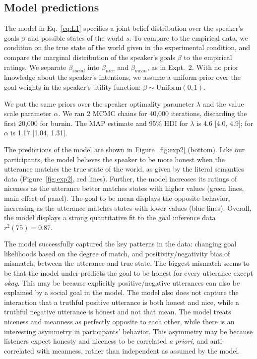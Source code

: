 \documentclass[10pt,letterpaper]{article}
\begin{document}
\subsection{Model predictions}

The model in Eq.~\ref{eq:L1} specifies a joint-belief distribution over the speaker's goals $\beta$ and possible states of the world $s$.
To compare to the empirical data, we condition on the true state of the world given in the experimental condition, and compare the marginal distribution of the speaker's goals $\beta$ to the empirical ratings.
We separate $\beta_{social}$ into  $\beta_{nice}$ and  $\beta_{mean}$, as in Expt.~2.
With no prior knowledge about the speaker's intentions, we assume a uniform prior over the goal-weights in the speaker's utility function: $\beta \sim \text{Uniform}(0,1)$.

We put the same priors over the speaker optimality parameter $\lambda$ and the value scale parameter $\alpha$.
We ran 2 MCMC chains for 40,000 iterations, discarding the first 20,000 for burnin.
The MAP estimate and 95\% HDI for $\lambda$ is 4.6 [4.0, 4.9]; for $\alpha$ is 1.17 [1.04, 1.31].%

The predictions of the model are shown in Figure~\ref{fig:exp2} (bottom).
Like our participants, the model believes the speaker to be more honest when the utterance matches the true state of the world, as given by the literal semantics data (Figure~\ref{fig:exp2}, red lines).
Further, the model increases its ratings of niceness as the utterance better matches states with higher values (green lines, main effect of panel).
The goal to be mean displays the opposite behavior, increasing as the utterance matches states with lower values (blue lines).
Overall, the model displays a strong quantitative fit to the goal inference data $r^2(75) = 0.87$.

The model successfully captured the key patterns in the data:
changing goal likelihoods based on the degree of match, and positivity/negativity bias of mismatch, between the utterance and true state.
The biggest mismatch seems to be that the model under-predicts the goal to be honest for every utterance except \emph{okay}.
This may be because explicitly positive/negative utterances can also be explained by a social goal in the model.
The model also does not capture the interaction that a truthful positive utterance is both honest and nice, while a truthful negative utterance is honest and not that mean.
 The model treats niceness and meanness as perfectly opposite to each other, while there is an interesting asymmetry in participants' behavior. 
This asymmetry may be because listeners expect honesty and niceness to be correlated \emph{a priori}, and anti-correlated with meanness, rather than independent as assumed by the model.
\end{document}
